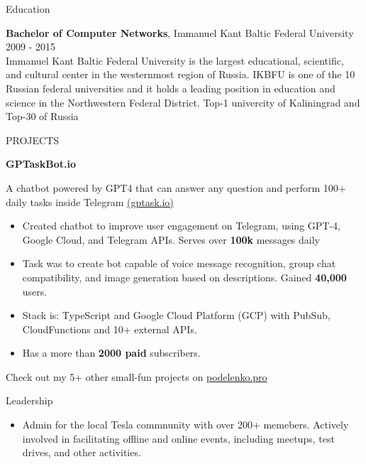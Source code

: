 \documentclass{template} %
\begin{document}
\begin{rSection}{Education}

{\bf Bachelor of Computer Networks}, Immanuel Kant Baltic Federal University \hfill {2009 - 2015} \vspace{0.2cm}\\
Immanuel Kant Baltic Federal University is the largest educational, scientific, and cultural center in the westernmost region of Russia. IKBFU is one of the 10 Russian federal universities and it holds a leading position in education and science in the Northwestern Federal District.
Top-1 univercity of Kaliningrad and Top-30 of Russia \\

\end{rSection}


\begin{rSection}{PROJECTS}
\vspace{-1.25em}
\item \textbf{GPTaskBot.io} {A chatbot powered by GPT4 that can answer any question and perform 100+ daily tasks inside Telegram \href{https://gptask.io/}{(gptask.io)}
    \begin{itemize}
        \itemsep-3pt {} 
        \item Created chatbot to improve user engagement on Telegram, using GPT-4, Google Cloud, and Telegram APIs. Serves over \textbf{100k} messages daily
        \item Task was to create bot capable of voice message recognition, group chat compatibility, and image generation based on descriptions. Gained \textbf{40,000} users.
        \item Stack is: TypeScript and Google Cloud Platform (GCP) with PubSub, CloudFunctions and 10+ external APIs.
        \item Has a more than \textbf{2000 paid} subscribers.
    \end{itemize}
}
Check out my 5+ other small-fun projects on \href{https://podelenko.pro/#fun}{podelenko.pro}
\end{rSection} 


\begin{rSection}{Leadership} 
\begin{itemize}
    \item Admin for the local Tesla commnunity with over 200+ memebers. Actively involved in facilitating offline and online events, including meetups, test drives, and other activities.
\end{itemize}


\end{rSection}
\end{document}

